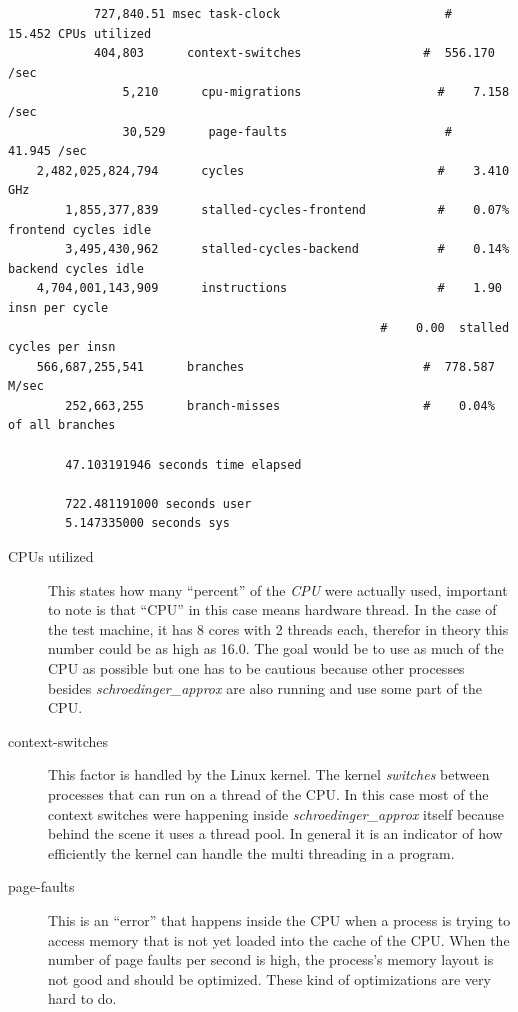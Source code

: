 \documentclass[11pt,DIV=10,final]{scrreprt} %
\begin{document}
\begin{minipage}{\textwidth}
    \begin{lstlisting}
            727,840.51 msec task-clock                       #   15.452 CPUs utilized
            404,803      context-switches                 #  556.170 /sec
                5,210      cpu-migrations                   #    7.158 /sec
                30,529      page-faults                      #   41.945 /sec
    2,482,025,824,794      cycles                           #    3.410 GHz
        1,855,377,839      stalled-cycles-frontend          #    0.07% frontend cycles idle
        3,495,430,962      stalled-cycles-backend           #    0.14% backend cycles idle
    4,704,001,143,909      instructions                     #    1.90  insn per cycle
                                                    #    0.00  stalled cycles per insn
    566,687,255,541      branches                         #  778.587 M/sec
        252,663,255      branch-misses                    #    0.04% of all branches

        47.103191946 seconds time elapsed

        722.481191000 seconds user
        5.147335000 seconds sys
    \end{lstlisting}
    \begin{description}
      \item[CPUs utilized] This states how many ``percent'' of the \emph{CPU} were actually used, important to note is that ``CPU'' in this case means hardware thread. In the case of the test machine, it
            has 8 cores with 2 threads each, therefor in theory this number could be as high as 16.0. The goal would be to use as much of the CPU as possible but one has to be cautious because other
            processes besides \emph{schroedinger\_approx} are also running and use some part of the CPU.

      \item[context-switches] This factor is handled by the Linux kernel. The kernel \emph{switches} between processes that can run on a thread of the CPU. In this case most of the context switches were
            happening inside \emph{schroedinger\_approx} itself because behind the scene it uses a thread pool. In general it is an indicator of how efficiently the kernel can handle the multi threading in
            a program.
      \item[page-faults] This is an ``error'' that happens inside the CPU when a process is trying to access memory that is not yet loaded into the cache of the CPU. When the number of page faults per
            second is high, the process's memory layout is not good and should be optimized. These kind of optimizations are very hard to do.


\end{description}
\end{minipage}
\end{document}
